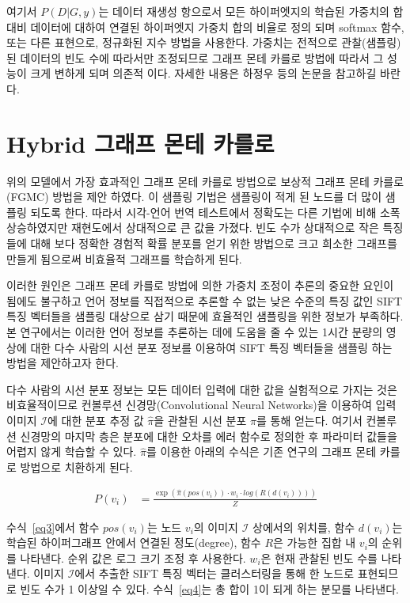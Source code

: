 \documentclass{kcc}
\begin{document}
여기서 $P(D|G,y)$는 데이터 재생성 항으로서 모든 하이퍼엣지의 학습된 가중치의 합 대비 데이터에 대하여 연결된 하이퍼엣지 가중치 합의 비율로 정의 되며 softmax 함수, 또는 다른 표현으로, 정규화된 지수 방법을 사용한다. 가중치는 전적으로 관찰(샘플링) 된 데이터의 빈도 수에 따라서만 조정되므로 그래프 몬테 카를로 방법에 따라서 그 성능이 크게 변하게 되며 의존적 이다\cite{zhang1994accelerated,Zhang1998}. 자세한 내용은 하정우 등\cite{Ha2015}의 논문을 참고하길 바란다.

\section{Hybrid 그래프 몬테 카를로}
위의 모델에서 가장 효과적인 그래프 몬테 카를로 방법으로 보상적 그래프 몬테 카를로(FGMC) 방법을 제안 하였다. 이 샘플링 기법은 샘플링이 적게 된 노드를 더 많이 샘플링 되도록 한다. 따라서 시각-언어 번역 테스트에서 정확도는 다른 기법에 비해 소폭 상승하였지만 재현도에서 상대적으로 큰 값을 가졌다. 빈도 수가 상대적으로 작은 특징들에 대해 보다 정확한 경험적 확률 분포를 얻기 위한 방법으로 크고 희소한 그래프를 만들게 됨으로써 비효율적 그래프를 학습하게 된다.

이러한 원인은 그래프 몬테 카를로 방법에 의한 가중치 조정이 추론의 중요한 요인이 됨에도 불구하고 언어 정보를 직접적으로 추론할 수 없는 낮은 수준의 특징 값인 SIFT 특징 벡터들을 샘플링 대상으로 삼기 때문에 효율적인 샘플링을 위한 정보가 부족하다. 본 연구에서는 이러한 언어 정보를 추론하는 데에 도움을 줄 수 있는 1시간 분량의 영상에 대한 다수 사람의 시선 분포 정보를 이용하여 SIFT 특징 벡터들을 샘플링 하는 방법을 제안하고자 한다.

다수 사람의 시선 분포 정보는 모든 데이터 입력에 대한 값을 실험적으로 가지는 것은 비효율적이므로 컨볼루션 신경망(Convolutional Neural Networks)을 이용하여 입력 이미지 $\mathcal{I}$에 대한 분포 추정 값 $\hat{\pi}$을 관찰된 시선 분포 $\pi$를 통해 얻는다. 여기서 컨볼루션 신경망의 마지막 층은 분포에 대한 오차를 에러 함수로 정의한 후 파라미터 값들을 어렵지 않게 학습할 수 있다. $\hat{\pi}$를 이용한 아래의 수식은 기존 연구의 그래프 몬테 카를로 방법으로 치환하게 된다.

\begin{equation} 
\begin{split}
P(v_{i}) & = \frac{\exp(\hat{\pi}(pos(v_{i})) \cdot w_{i} \cdot log(R(d(v_{i}))))}{Z}
\end{split}
\end{equation}

수식~\ref{eq3}에서 함수 $pos(v_{i})$는 노드 $v_{i}$의 이미지 $\mathcal{I}$ 상에서의 위치를, 함수 $d(v_{i})$는 학습된 하이퍼그래프 안에서 연결된 정도(degree), 함수 $R$은 가능한 집합 내 $v_{i}$의 순위를 나타낸다. 순위 값은 로그 크기 조정 후 사용한다. $w_{i}$은 현재 관찰된 빈도 수를 나타낸다. 이미지 $\mathcal{I}$에서 추출한 SIFT 특징 벡터는 클러스터링을 통해 한 노드로 표현되므로 빈도 수가 1 이상일 수 있다. 수식~\ref{eq4}는 총 합이 1이 되게 하는 분모를 나타낸다.
\end{document}
